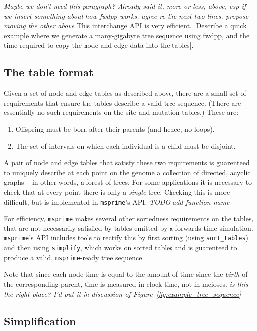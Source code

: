 \documentclass{article}
\newcommand{\msprime}{\texttt{msprime}}
\newcommand{\plr}[1]{{\em \color{blue} #1}}
\newcommand{\jda}[1]{{\em \color{cyan} #1}}
\begin{document}
\plr{Maybe we don't need this paragraph? Already said it, more or less, above, esp if we insert something about how fwdpp works.}
\jda{agree re the next two lines. propose moving the other above}
This interchange API is very efficient. [Describe a quick example where we generate
a many-gigabyte tree sequence using fwdpp, and the time required
to copy the node and edge data into the tables].

\subsection*{The table format}

Given a set of node and edge tables as described above,
there are a small set of requirements that ensure the tables
describe a valid tree sequence.
(There are essentially no such requirements on the site and mutation tables.)
These are:
\begin{enumerate}
    \item Offspring must be born after their parents (and hence, no loops).
    \item The set of intervals on which each individual is a child must be disjoint.
\end{enumerate}
A pair of node and edge tables that satisfy these two requirements
is guarenteed to uniquely describe at each point on the genome
a collection of directed, acyclic graphs -- in other words, a forest of trees.
For some applications it is necessary to check that at every point
there is only a \emph{single} tree.  
Checking this is more difficult, but is implemented in \msprime{}'s API.
\jda{TODO add function name}

For efficiency, \msprime{} makes several other sortedness requirements on the tables,
that are not necessarily satisfied by tables emitted by a forwards-time simulation.
\msprime{}'s API includes tools to rectify this by first sorting (using \texttt{sort\_tables})
and then using \texttt{simplify}, which works on sorted tables
and is guarenteed to produce a valid, \msprime{}-ready tree sequence.

Note that since each node time is equal to the amount of time since the \emph{birth} of the
corresponding parent, time is measured in clock time, not in meioses.
\jda{is this the right place? I'd put it in discussion of Figure~\ref{fig:example_tree_sequence}}


\subsection*{Simplification}
\end{document}
